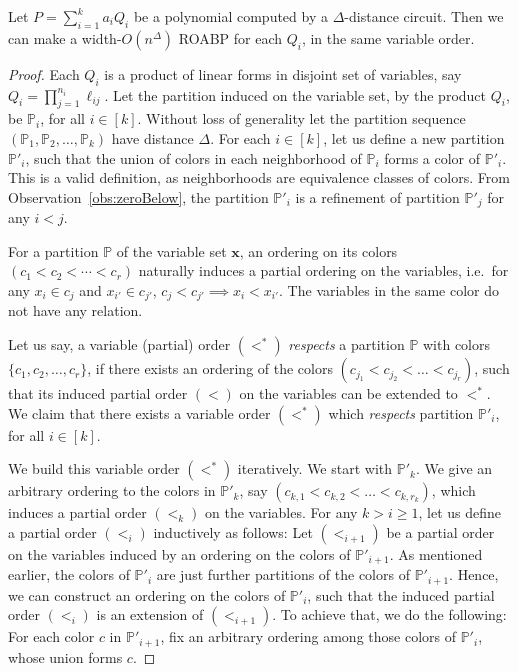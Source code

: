 \documentclass[final,oneeqnum, onethmnum, onefignum]{siamltex1213}
\renewcommand{\P}{\mathbb P}
\newcommand{\di}{\Delta} %
\begin{document}
\begin{lemma}
Let $P = \sum_{i = 1}^k a_i Q_i$ be a polynomial computed
by a $\di$-distance circuit. Then we can make a width-$O(n^{\di})$ ROABP 
for each $Q_i$, in the same variable order.
\end{lemma}
\begin{proof}
Each $Q_i$ is a product of linear forms in disjoint set of variables, 
say $Q_i = \prod_{j=1}^{n_i} \ell_{ij}$.
Let the partition induced on the variable set, by the product $Q_i$,
be $\P_i$, for all $i \in [k]$.
Without loss of generality let the partition sequence 
$(\P_1, \P_2, \dots, \P_k)$ have distance $\di$.
For each $i \in [k]$, let us define a new partition 
$\P'_i$, such that the union of colors in each neighborhood of $\P_i$
forms a color of $\P'_i$.
This is a valid definition, as neighborhoods are equivalence classes of
colors. 
From Observation~\ref{obs:zeroBelow}, the partition $\P'_i$
is a refinement of partition $\P'_j$ for any $i<j$.

For a partition $\P$ of the variable set $\mathbf{x}$, 
an ordering on its colors
$(c_1 < c_2 < \dotsm < c_r)$ naturally induces a partial ordering 
on the variables, i.e.\ for any $x_i \in c_{j}$ and $x_{i'} \in c_{j'}$,
$c_j < c_{j'} \implies x_i < x_{i'}$.
The variables in the same color do not have any relation.

Let us say, a variable (partial) order
$(<^*)$ {\em respects} 
a partition $\P$ with colors $\{c_1, c_2, \dots, c_r\}$,
if there exists an ordering of the colors $(c_{j_1} < c_{j_2} < \dots < c_{j_r})$,
such that its induced partial order $(<)$ on the variables can be extended to $<^*$.
We claim that there exists a variable order $(<^*)$
which {\em respects} partition $\P'_i$, for all $i \in [k]$.

We build this variable order $(<^*)$ iteratively.
We start with $\P'_k$. 
We give an arbitrary ordering to the colors in $\P'_k$, 
say $(c_{k,1} < c_{k,2} < \dots < c_{k,r_k})$, which induces
a partial order $(<_k)$ on the variables. 
For any $k > i \geq 1$, let us define a partial order $(<_i)$
inductively as follows:
Let $(<_{i+1})$ be a partial order on the variables induced
by an ordering on the colors of $\P'_{i+1}$.
As mentioned earlier, the colors of $\P'_i$ are just further partitions
of the colors of $\P'_{i+1}$. 
Hence, we can construct an ordering on the colors of $\P'_i$,
such that the induced partial order $(<_i)$ is an extension of $(<_{i+1})$.
To achieve that, we do the following: For each color $c$ in $\P'_{i+1}$,
fix an arbitrary ordering among those colors of $\P'_i$, whose union forms $c$.


\end{proof}
\end{document}
